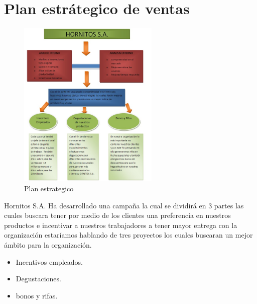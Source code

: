 \section{Plan estr\'ategico de ventas}
\begin{figure}[htbp]
	\centering
		\includegraphics[width=0.60\textwidth]{images/Dibujo.jpg}
	\caption{Plan estrategico}
	\label{fig:Plan estrategico}
\end{figure}%
Hornitos S.A. Ha desarrollado una campa\~na la cual se dividir\'a en 3 partes las cuales buscara tener  por medio de los clientes una preferencia en nuestros productos e incentivar a nuestros trabajadores a tener mayor entrega con la organizaci\'on estar\'iamos hablando de tres proyectos los cuales buscaran un mejor \'ambito para la organizaci\'on.%
\\%
	
	\begin{itemize}
		\item Incentivos empleados.
		\item Degustaciones.
		\item bonos y rifas.
	\end{itemize}
	
